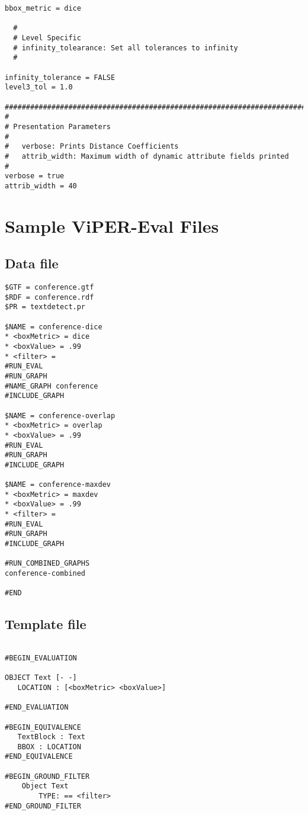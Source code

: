\begin{verbatim}
bbox_metric = dice

  #
  # Level Specific
  #	infinity_tolearance: Set all tolerances to infinity
  # 

infinity_tolerance = FALSE
level3_tol = 1.0

########################################################################
#
# Presentation Parameters
#
#	verbose: Prints Distance Coefficients
#	attrib_width: Maximum width of dynamic attribute fields printed
#
verbose = true
attrib_width = 40

\end{verbatim}

\newpage
\section{Sample ViPER-Eval Files}
\label{a:viper-eval}
\subsection{Data file}
\begin{verbatim}
$GTF = conference.gtf
$RDF = conference.rdf
$PR = textdetect.pr

$NAME = conference-dice
* <boxMetric> = dice
* <boxValue> = .99
* <filter> = 
#RUN_EVAL
#RUN_GRAPH
#NAME_GRAPH conference
#INCLUDE_GRAPH

$NAME = conference-overlap
* <boxMetric> = overlap
* <boxValue> = .99
#RUN_EVAL
#RUN_GRAPH
#INCLUDE_GRAPH

$NAME = conference-maxdev
* <boxMetric> = maxdev
* <boxValue> = .99
* <filter> = 
#RUN_EVAL
#RUN_GRAPH
#INCLUDE_GRAPH

#RUN_COMBINED_GRAPHS
conference-combined

#END
\end{verbatim}

\subsection{Template file}

\begin{verbatim}

#BEGIN_EVALUATION

OBJECT Text [- -]
   LOCATION : [<boxMetric> <boxValue>]

#END_EVALUATION

#BEGIN_EQUIVALENCE
   TextBlock : Text
   BBOX : LOCATION 
#END_EQUIVALENCE

#BEGIN_GROUND_FILTER
	Object Text
		TYPE: == <filter>
#END_GROUND_FILTER
\end{verbatim}









